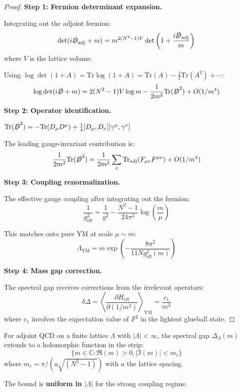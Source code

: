 \begin{proof}
\textbf{Step 1: Fermion determinant expansion.}

Integrating out the adjoint fermion:
\[
\det(i\slashed{D}_{\mathrm{adj}} + m) = m^{2(N^2-1)V} \det\left(1 + \frac{i\slashed{D}_{\mathrm{adj}}}{m}\right)
\]
where $V$ is the lattice volume.

Using $\log\det(1+A) = \text{Tr}\log(1+A) = \text{Tr}(A) - \frac{1}{2}\text{Tr}(A^2) + \cdots$:
\[
\log\det(i\slashed{D} + m) = 2(N^2-1)V \log m - \frac{1}{2m^2}\text{Tr}(\slashed{D}^2) + O(1/m^4)
\]

\textbf{Step 2: Operator identification.}

$\text{Tr}(\slashed{D}^2) = -\text{Tr}(D_\mu D^\mu) + \frac{1}{4}[D_\mu, D_\nu][\gamma^\mu, \gamma^\nu]$

The leading gauge-invariant contribution is:
\[
\frac{1}{2m^2}\text{Tr}(\slashed{D}^2) = \frac{1}{2m^2}\sum_x \text{Tr}_{\mathrm{adj}}(F_{\mu\nu}F^{\mu\nu}) + O(1/m^4)
\]

\textbf{Step 3: Coupling renormalization.}

The effective gauge coupling after integrating out the fermion:
\[
\frac{1}{g_{\mathrm{eff}}^2} = \frac{1}{g^2} - \frac{N^2-1}{24\pi^2}\log\left(\frac{m}{\mu}\right)
\]

This matches onto pure YM at scale $\mu \sim m$:
\[
\Lambda_{\mathrm{YM}} = m \exp\left(-\frac{8\pi^2}{11 N g_{\mathrm{eff}}^2(m)}\right)
\]

\textbf{Step 4: Mass gap correction.}

The spectral gap receives corrections from the irrelevant operators:
\[
\delta\Delta = \left\langle \frac{\partial H_{\mathrm{eff}}}{\partial(1/m^2)}\right\rangle_{\mathrm{YM}} = \frac{c_1}{m^2}
\]
where $c_1$ involves the expectation value of $F^2$ in the lightest glueball state.
\end{proof}

\begin{theorem}
\label{thm:m-analyticity-strip}
For adjoint QCD on a finite lattice $\Lambda$ with $|\Lambda| < \infty$, the 
spectral gap $\Delta_\Lambda(m)$ extends to a holomorphic function in the strip:
\[
\{m \in \mathbb{C} : \Re(m) > 0, |\Im(m)| < m_c\}
\]
where $m_c = \pi/(a\sqrt{(N^2-1)})$ with $a$ the lattice spacing.

The bound is \textbf{uniform in $|\Lambda|$} for the strong coupling regime.
\end{theorem}

